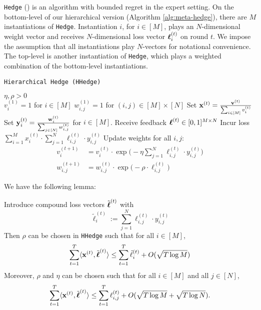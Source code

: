 \texttt{Hedge} (\cite{chang:05}) is an algorithm with bounded regret in the expert setting.
On the bottom-level of our hierarchical version (Algorithm \ref{alg:meta-hedge}), there are $M$ instantiations of \texttt{Hedge}. Instantiation $i$, for $i\in[M]$, plays an $N$-dimensional weight vector and receives $N$-dimensional loss vector $\boldsymbol\ell^{(t)}_{i}$ on round $t$. We impose the assumption that all instantiations play $N$-vectors for notational convenience. The top-level is another instantiation of \texttt{Hedge}, which plays a weighted combination of the bottom-level instantiations.

\begin{algorithm}
   \caption{\texttt{Hierarchical Hedge (HHedge)}}
   \label{alg:meta-hedge}
   \begin{algorithmic}   
   	 $\eta,\rho>0$\\
   	\STATE $v^{(1)}_{i}=1$ for $i\in[M]$
   	\STATE $w^{(1)}_{i,j}=1$ for $(i,j)\in[M]\times[N]$
	   \STATE Set ${\mathbf x}^{(t)} = \frac{{\mathbf v}^{(t)}}{\sum_{i\in[M]} v^{(t)}_{i}}$
	   \STATE Set ${\mathbf y}^{(t)}_{i} = \frac{{\mathbf w}^{(t)}_{i}}{\sum_{j\in[N]} w^{(t)}_{i,j}}$ for $i\in[M]$.
		\STATE Receive feedback $\boldsymbol\ell^{(t)}\in [0,1]^{M\times N}$ %
		\STATE Incur loss $\sum_{i=1}^{M} x^{(t)}_{i}\cdot\sum_{j=1}^N\ell^{(t)}_{i,j}\cdot y^{(t)}_{i,j}$
		\STATE Update weights for all $i,j$:
		\begin{align}
			v^{(t+1)}_i & = v^{(t)}_{i}\cdot \exp\big(-\eta \sum_{j=1}^N\ell^{(t)}_{i,j}\cdot y^{(t)}_{i,j}\big)
			\\
			w^{(t+1)}_{i,j} & = w^{(t)}_{i,j}\cdot \exp\big(-\rho\cdot \ell^{(t)}_{i,j}\big)
		\end{align}
    	\ENDFOR
   	\end{algorithmic}
\end{algorithm}

We have the following lemma:

\begin{lem}\label{lem:meta-hedge}
	Introduce compound loss vectors $\tilde{\boldsymbol\ell}^{(t)}$ with 
	$$\tilde{\ell}^{(t)}_i := \sum_{j=1}^N \ell^{(t)}_{i,j}\cdot y^{(t)}_{i,j}$$
	Then $\rho$ can be chosen in \texttt{HHedge} such that for all $i\in[M]$,
	\begin{equation}
		\sum_{t=1}^T \langle {\mathbf x}^{(t)},\tilde{\boldsymbol\ell}^{(t)}\rangle 
		\leq  \sum_{t=1}^T \tilde{\ell}^{(t)}_i +
		 O(\sqrt{T \log M})
	\end{equation}
	Moreover, $\rho$ and $\eta$ can be chosen such that for all $i\in[M]$ and all $j\in[N]$,
	\begin{equation}
	   \sum_{t=1}^T \langle {\mathbf x}^{(t)},\tilde{\boldsymbol\ell}^{(t)}\rangle 
		\leq \sum_{t=1}^T\ell^{(t)}_{i,j}
		+ O(\sqrt{T \log M} + \sqrt{T \log N}).
	\end{equation}
\end{lem}


